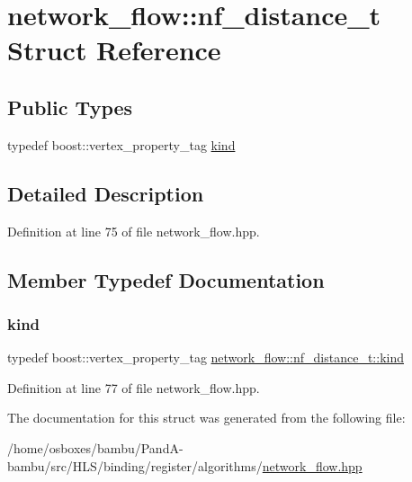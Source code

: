 \hypertarget{structnetwork__flow_1_1nf__distance__t}{}\section{network\+\_\+flow\+:\+:nf\+\_\+distance\+\_\+t Struct Reference}
\label{structnetwork__flow_1_1nf__distance__t}
\subsection*{Public Types}
\begin{DoxyCompactItemize}
\item 
typedef boost\+::vertex\+\_\+property\+\_\+tag \hyperlink{structnetwork__flow_1_1nf__distance__t_ab39eb23a022af72b7158bc4988db65a0}{kind}
\end{DoxyCompactItemize}


\subsection{Detailed Description}


Definition at line 75 of file network\+\_\+flow.\+hpp.



\subsection{Member Typedef Documentation}
\mbox{\label{structnetwork__flow_1_1nf__distance__t_ab39eb23a022af72b7158bc4988db65a0}} 
\subsubsection{\texorpdfstring{kind}{kind}}
{\footnotesize\ttfamily typedef boost\+::vertex\+\_\+property\+\_\+tag \hyperlink{structnetwork__flow_1_1nf__distance__t_ab39eb23a022af72b7158bc4988db65a0}{network\+\_\+flow\+::nf\+\_\+distance\+\_\+t\+::kind}}



Definition at line 77 of file network\+\_\+flow.\+hpp.



The documentation for this struct was generated from the following file\+:\begin{DoxyCompactItemize}
\item 
/home/osboxes/bambu/\+Pand\+A-\/bambu/src/\+H\+L\+S/binding/register/algorithms/\hyperlink{network__flow_8hpp}{network\+\_\+flow.\+hpp}\end{DoxyCompactItemize}
